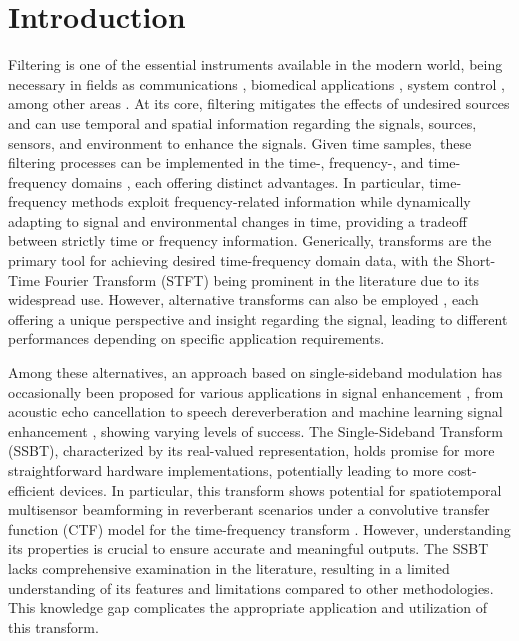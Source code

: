 \section{Introduction}
\label{sec:introduction}


Filtering is one of the essential instruments available in the modern world, being necessary in fields as communications \cite{chen_source_2002}, biomedical applications \cite{lobato_worst-case-optimization_2020,lu_biomedical_1994,nguyen_minimum_2017}, system control \cite{han_comparative_2016, hagglund_signal_2012}, among other areas \cite{hathcock_noise_2016,lee_general_2002,shi_new_2004}. At its core, filtering mitigates the effects of undesired sources and can use temporal and spatial information regarding the signals, sources, sensors, and environment to enhance the signals. Given time samples, these filtering processes can be implemented in the time-, frequency-, and time-frequency domains \cite{benesty_fundamentals_2017}, each offering distinct advantages. In particular, time-frequency methods exploit frequency-related information while dynamically adapting to signal and environmental changes in time, providing a tradeoff between strictly time or frequency information. Generically, transforms are the primary tool for achieving desired time-frequency domain data, with the Short-Time Fourier Transform (STFT) \cite{kiymik_comparison_2005,pan_microphone_2021} being prominent in the literature due to its widespread use. However, alternative transforms can also be employed \cite{chen_wavelet-based_2018,yang_general_2014,almeida_fractional_1994}, each offering a unique perspective and insight regarding the signal, leading to different performances depending on specific application requirements.


Among these alternatives, an approach based on single-sideband modulation has occasionally been proposed \cite{crochiere_multirate_1983} for various applications in signal enhancement \cite{wackersreuther_new_1986,harteneck_design_1999}, from acoustic echo cancellation \cite{chin_subband_2001} to speech dereverberation \cite{oyzerman_system_2012} and machine learning signal enhancement \cite{okamoto_subband_2017}, showing varying levels of success. The Single-Sideband Transform (SSBT), characterized by its real-valued representation, holds promise for more straightforward hardware implementations, potentially leading to more cost-efficient devices. In particular, this transform shows potential for spatiotemporal multisensor beamforming in reverberant scenarios \cite{talmon_multichannel_2009} under a convolutive transfer function (CTF) model for the time-frequency transform \cite{talmon_relative_2009}. However, understanding its properties is crucial to ensure accurate and meaningful outputs. The SSBT lacks comprehensive examination in the literature, resulting in a limited understanding of its features and limitations compared to other methodologies. This knowledge gap complicates the appropriate application and utilization of this transform.

